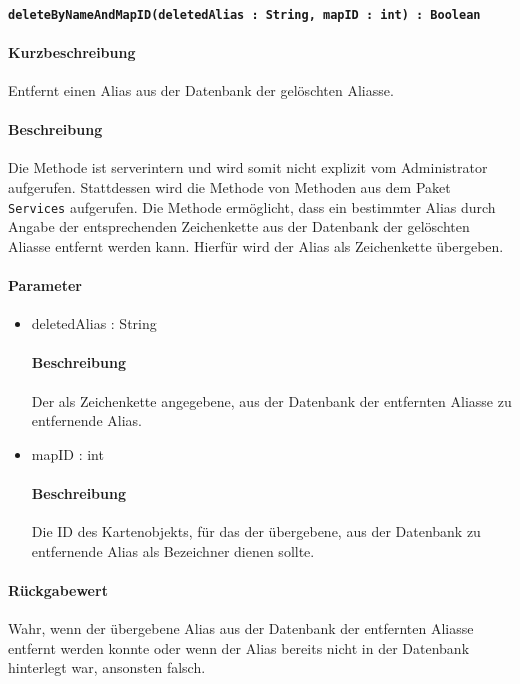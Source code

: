 \paragraph{\texttt{deleteByNameAndMapID(deletedAlias : String, mapID : int) : Boolean}}%
\paragraph*{Kurzbeschreibung}
Entfernt einen Alias aus der Datenbank der gelöschten Aliasse.
\paragraph*{Beschreibung}
Die Methode ist serverintern und wird somit nicht explizit vom Administrator aufgerufen.
Stattdessen wird die Methode von Methoden aus dem Paket \texttt{Services} aufgerufen.
Die Methode ermöglicht, dass ein bestimmter Alias durch Angabe der entsprechenden Zeichenkette aus der Datenbank der gelöschten Aliasse entfernt werden kann.
Hierfür wird der Alias als Zeichenkette übergeben.
\paragraph*{Parameter}
\begin{itemize}
    \item deletedAlias : String
    		\paragraph*{Beschreibung}
    		Der als Zeichenkette angegebene, aus der Datenbank der entfernten Aliasse zu entfernende Alias.
    	\item mapID : int
    		\paragraph*{Beschreibung}
    		Die ID des Kartenobjekts, für das der übergebene, aus der Datenbank zu entfernende Alias als Bezeichner dienen sollte.
\end{itemize}
\paragraph*{Rückgabewert}
Wahr, wenn der übergebene Alias aus der Datenbank der entfernten Aliasse entfernt werden konnte oder wenn der Alias bereits nicht in der Datenbank hinterlegt war, ansonsten falsch.
